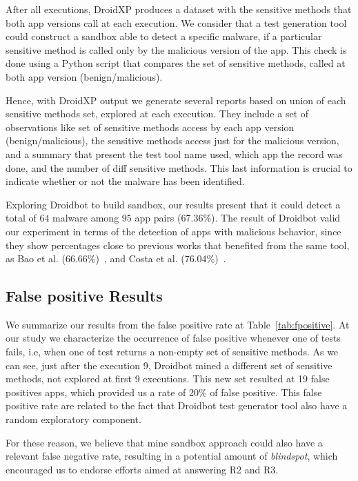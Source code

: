 After all executions, DroidXP produces a dataset with the sensitive methods that both app versions call at each execution. We consider that a test generation tool could construct a sandbox able to detect a specific malware, if a particular sensitive method is called only by the malicious version of the app. This check is done using a Python script that compares the set of sensitive methods, called at both app version (benign/malicious).

Hence, with DroidXP output we generate several reports based on union of each sensitive methods set, explored at each execution. They include a set of observations like set of sensitive methods access by each app version (benign/malicious), the sensitive methods access just for the malicious version, and a summary that present the test tool name used, which app the record was done, and the number of diff sensitive methods. This last information is crucial to indicate whether or not the malware has been identified. 

Exploring Droidbot to build sandbox, our results present that it could detect a total of $64$ malware among $95$ app pairs (67.36\%). The result of Droidbot valid our experiment in terms of the detection of apps with malicious behavior, since they show percentages close to previous works that benefited from the same tool, as Bao et al. (66.66\%)~\cite{DBLP:conf/wcre/BaoLL18}, and Costa et al. (76.04\%)~\cite{DBLP:journals/jss/CostaMMSSBNR22}.

\subsection{False positive Results}\label{sec:falsePositiveResults}

We summarize our results from the false positive rate at Table~\ref{tab:fpositive}. At our study we characterize the occurrence of false positive whenever one of tests fails, i.e, when one of test returns a non-empty set of sensitive methods. As we can see, just after the execution 9, Droidbot mined a different set of sensitive methods, not explored at first 9 executions. This new set resulted at 19 false positives apps, which provided us a rate of 20\% of false positive. This false positive rate are related to the fact that Droidbot test generator tool also have a random exploratory component. 

For these reason, we believe that mine sandbox approach could also have a relevant false negative rate, resulting in a potential amount of \textit{blindspot}, which encouraged us to endorse efforts aimed at answering R2 and R3.

